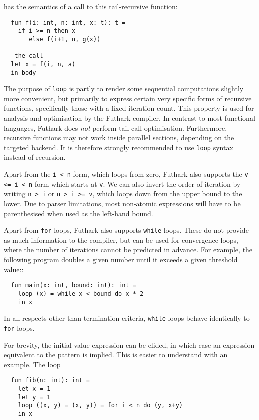 \documentclass[11pt]{book}
\begin{document}
has the semantics of a call to this tail-recursive function:

\begin{lstlisting}
  fun f(i: int, n: int, x: t): t =
    if i >= n then x
       else f(i+1, n, g(x))

-- the call
  let x = f(i, n, a)
  in body
\end{lstlisting}

The purpose of \texttt{loop} is partly to render some sequential
computations slightly more convenient, but primarily to express
certain very specific forms of recursive functions, specifically those
with a fixed iteration count.  This property is used for analysis and
optimisation by the Futhark compiler.  In contrast to most functional
languages, Futhark does \textit{not} perform tail call optimisation.
Furthermore, recursive functions may not work inside parallel
sections, depending on the targeted backend.  It is therefore strongly
recommended to use \texttt{loop} syntax instead of recursion.

Apart from the \texttt{i < n} form, which loops from zero, Futhark
also supports the \texttt{v <= i < n} form which starts at \texttt{v}.
We can also invert the order of iteration by writing \texttt{n > i} or
\texttt{n > i >= v}, which loops down from the upper bound to the
lower.  Due to parser limitations, most non-atomic expressions will
have to be parenthesised when used as the left-hand bound.

Apart from \texttt{for}-loops, Futhark also supports \texttt{while}
loops.  These do not provide as much information to the compiler, but
can be used for convergence loops, where the number of iterations
cannot be predicted in advance.  For example, the following program
doubles a given number until it exceeds a given threshold value::

\begin{lstlisting}
  fun main(x: int, bound: int): int =
    loop (x) = while x < bound do x * 2
    in x
\end{lstlisting}

In all respects other than termination criteria, \texttt{while}-loops
behave identically to \texttt{for}-loops.

For brevity, the initial value expression can be elided, in which case
an expression equivalent to the pattern is implied.  This is easier to
understand with an example.  The loop

\begin{lstlisting}
  fun fib(n: int): int =
    let x = 1
    let y = 1
    loop ((x, y) = (x, y)) = for i < n do (y, x+y)
    in x
\end{lstlisting}
\end{document}
